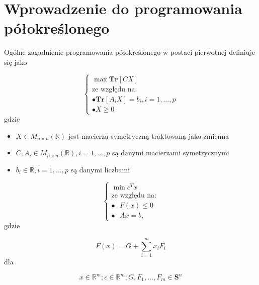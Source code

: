 \section{Wprowadzenie do programowania półokreślonego}

\begin{definition}
    Ogólne zagadnienie programowania półokreślonego w postaci pierwotnej definiuje się jako

    $$
        \begin{cases}
            \max \textbf{Tr}[CX] \\
            \text{ze względu na:} \\
            \bullet \textbf{Tr}[A_{i} X] = b_{i}, i = 1, \ldots, p \\
            \bullet X \geq 0
        \end{cases}
    $$
    gdzie

    \begin{itemize}
        \item $X \in M_{n \times n}(\mathbb{R})$ jest macierzą symetryczną traktowaną jako zmienna
        \item $C, A_{i} \in M_{n \times n}(\mathbb{R}), i = 1, \ldots , p$ są danymi macierzami symetrycznymi
        \item $b_{i} \in \mathbb{R}, i = 1, \ldots, p$ są danymi liczbami
    \end{itemize}
\end{definition}

\begin{definition}
    $$
        \begin{cases}
            \min c ^ {T} x \\
            \text{ze względu na:} \\
                \bullet \text{      } F(x) \leq 0 \\
                \bullet \text{      } A x = b,
        \end{cases}
    $$
    gdzie

    $$
        F(x) = G + \sum \limits_{i = 1}^{m} x_{i} F_{i}
    $$
    dla

    $$
        x \in \mathbb{R} ^ m; c \in \mathbb{R} ^ {m}; G, F_{1}, \ldots, F_{m} \in \textbf{S} ^ {n}
    $$
\end{definition}
